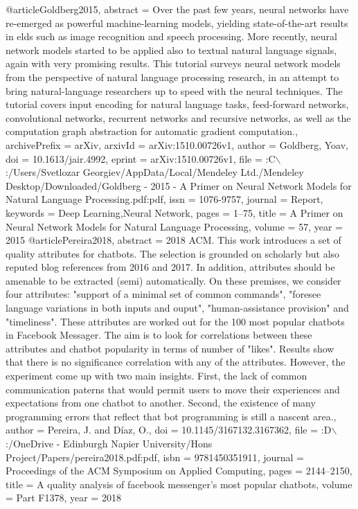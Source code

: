 @article{Goldberg2015,
      abstract = {Over the past few years, neural networks have re-emerged as powerful machine-learning models, yielding state-of-the-art results in elds such as image recognition and speech processing. More recently, neural network models started to be applied also to textual natural language signals, again with very promising results. This tutorial surveys neural network models from the perspective of natural language processing research, in an attempt to bring natural-language researchers up to speed with the neural techniques. The tutorial covers input encoding for natural language tasks, feed-forward networks, convolutional networks, recurrent networks and recursive networks, as well as the computation graph abstraction for automatic gradient computation.},
      archivePrefix = {arXiv},
      arxivId = {arXiv:1510.00726v1},
      author = {Goldberg, Yoav},
      doi = {10.1613/jair.4992},
      eprint = {arXiv:1510.00726v1},
      file = {:C$\backslash$:/Users/Svetlozar Georgiev/AppData/Local/Mendeley Ltd./Mendeley Desktop/Downloaded/Goldberg - 2015 - A Primer on Neural Network Models for Natural Language Processing.pdf:pdf},
      issn = {1076-9757},
      journal = {Report},
      keywords = {Deep Learning,Neural Network},
      pages = {1--75},
      title = {{A Primer on Neural Network Models for Natural Language Processing}},
      volume = {57},
      year = {2015}
}
@article{Pereira2018,
      abstract = {{\textcopyright} 2018 ACM. This work introduces a set of quality attributes for chatbots. The selection is grounded on scholarly but also reputed blog references from 2016 and 2017. In addition, attributes should be amenable to be extracted (semi) automatically. On these premises, we consider four attributes: "support of a minimal set of common commands", "foresee language variations in both inputs and ouput", "human-assistance provision" and "timeliness". These attributes are worked out for the 100 most popular chatbots in Facebook Messager. The aim is to look for correlations between these attributes and chatbot popularity in terms of number of "likes". Results show that there is no significance correlation with any of the attributes. However, the experiment come up with two main insights. First, the lack of common communication paterns that would permit users to move their experiences and expectations from one chatbot to another. Second, the existence of many programming errors that reflect that bot programming is still a nascent area.},
      author = {Pereira, J. and D{\'{i}}az, O.},
      doi = {10.1145/3167132.3167362},
      file = {:D$\backslash$:/OneDrive - Edinburgh Napier University/Hons Project/Papers/pereira2018.pdf:pdf},
      isbn = {9781450351911},
      journal = {Proceedings of the ACM Symposium on Applied Computing},
      pages = {2144--2150},
      title = {{A quality analysis of facebook messenger's most popular chatbots}},
      volume = {Part F1378},
      year = {2018}
}
